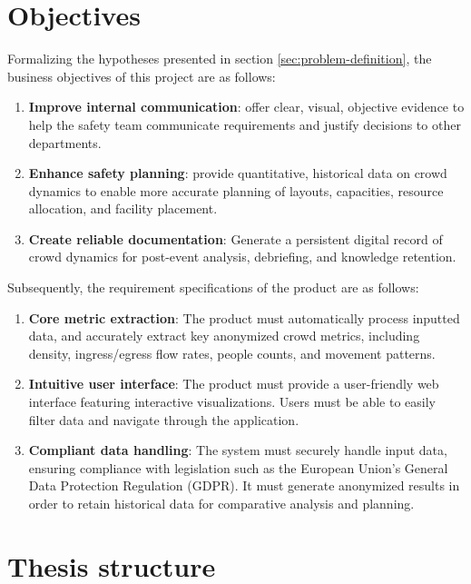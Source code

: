 \section{Objectives}
\label{sec:objectives}

Formalizing the hypotheses presented in section \ref{sec:problem-definition}, the business objectives of this project are as follows:
\begin{enumerate}
  \item \textbf{Improve internal communication}: offer clear, visual, objective evidence to help the safety team communicate requirements and justify decisions to other departments.
  \item \textbf{Enhance safety planning}: provide quantitative, historical data on crowd dynamics to enable more accurate planning of layouts, capacities, resource allocation, and facility placement.
  \item \textbf{Create reliable documentation}: Generate a persistent digital record of crowd dynamics for post-event analysis, debriefing, and knowledge retention.
\end{enumerate}

Subsequently, the requirement specifications of the product are as follows:
\begin{enumerate}
  \item \textbf{Core metric extraction}: The product must automatically process inputted data, and accurately extract key anonymized crowd metrics, including density, ingress/egress flow rates, people counts, and movement patterns.

  \item \textbf{Intuitive user interface}: The product must provide a user-friendly web interface featuring interactive visualizations. Users must be able to easily filter data and navigate through the application.

  \item \textbf{Compliant data handling}: The system must securely handle input data, ensuring compliance with legislation such as the European Union's General Data Protection Regulation (GDPR). It must generate anonymized results in order to retain historical data for comparative analysis and planning.
\end{enumerate}


\section{Thesis structure}

